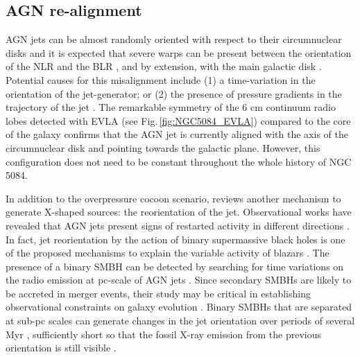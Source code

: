 \documentclass[modern]{CORE-AAS/aastex631}
\begin{document}
\subsection{AGN re-alignment}
\label{subsec:discussion_realignment}

AGN jets can be almost randomly oriented with respect to their circumnuclear disks \citep{schmitt+2002apj575_150}  and it is expected that severe warps can be present between the orientation of the NLR and the BLR \citep{lawrence+2010apj714_561}, and by extension, with the main galactic disk \citep{clarke+1998apj495_189, nagar+1999apj516_97, kinney+2000apj537_152}. Potential causes for this misalignment include (1) a time-variation in the orientation of the jet-generator; or (2) the presence of pressure gradients in the trajectory of the jet \citep{gallimore+2006aj132_546}. The remarkable symmetry of the 6 cm continuum radio lobes detected with EVLA (see Fig.\,\ref{fig:NGC5084_EVLA}) compared to the core of the galaxy confirms that the AGN jet is currently aligned with the axis of the circumnuclear disk and pointing towards the galactic plane. However, this configuration does not need to be constant throughout the whole history of NGC\,5084. 

In addition to the overpressure cocoon scenario, \citet{giri+2024sci11_1371101} reviews another mechanism to generate X-shaped sources: the reorientation of the jet. Observational works have revealed that AGN jets present signs of restarted activity in different directions  \citep{saripalli+2013mnras436_690, nandi+2021apj908_178}. In fact, jet reorientation by the action of binary supermassive black holes is one of the proposed mechanisms to explain the variable activity of blazars \citep{britzen+2018mnras478_3199}. The presence of a binary SMBH can be detected by searching for time variations on the radio emission at pc-scale of AGN jets \citep{jiang+2023apj959_11}. Since secondary SMBHs are likely to be accreted in merger events, their study may be critical in establishing observational constraints on galaxy evolution \citep{yu2002mnras331_935}. Binary SMBHs that are separated at sub-pc scales can generate changes in the jet orientation over periods of several Myr \citep{giri+2024sci11_1371101}, sufficiently short so that the fossil X-ray emission from the previous orientation is still visible \citep[$\sim10-20$ Myr]{zubovas+2022mnras515_1705}. 
\end{document}
